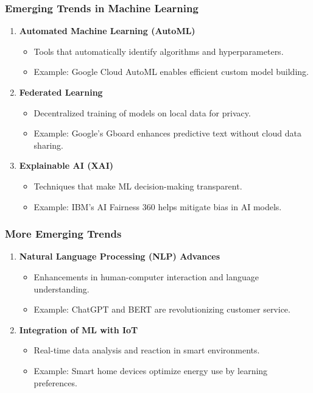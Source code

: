 \documentclass{beamer}
\begin{document}
\begin{frame}[fragile]
    \frametitle{Emerging Trends in Machine Learning}
    \begin{enumerate}
        \item \textbf{Automated Machine Learning (AutoML)}
            \begin{itemize}
                \item Tools that automatically identify algorithms and hyperparameters.
                \item Example: Google Cloud AutoML enables efficient custom model building.
            \end{itemize}

        \item \textbf{Federated Learning}
            \begin{itemize}
                \item Decentralized training of models on local data for privacy.
                \item Example: Google's Gboard enhances predictive text without cloud data sharing.
            \end{itemize}

        \item \textbf{Explainable AI (XAI)}
            \begin{itemize}
                \item Techniques that make ML decision-making transparent.
                \item Example: IBM’s AI Fairness 360 helps mitigate bias in AI models.
            \end{itemize}
    \end{enumerate}
\end{frame}

\begin{frame}[fragile]
    \frametitle{More Emerging Trends}
    \begin{enumerate}[resume]
        \item \textbf{Natural Language Processing (NLP) Advances}
            \begin{itemize}
                \item Enhancements in human-computer interaction and language understanding.
                \item Example: ChatGPT and BERT are revolutionizing customer service.
            \end{itemize}

        \item \textbf{Integration of ML with IoT}
            \begin{itemize}
                \item Real-time data analysis and reaction in smart environments.
                \item Example: Smart home devices optimize energy use by learning preferences.
            \end{itemize}
    \end{enumerate}
\end{frame}
\end{document}
